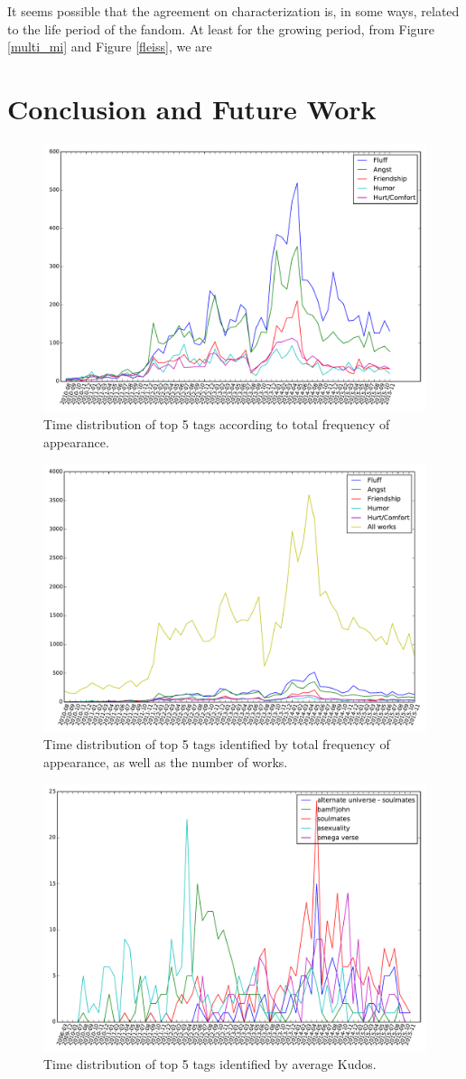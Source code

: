 \documentclass{pnastwo}
\begin{document}
\begin{article}
It seems possible that the agreement on characterization is, in some ways, related to the life period of the fandom. At least for the growing period, from Figure \ref{multi_mi} and Figure \ref{fleiss}, we are 


\section{Conclusion and Future Work}


\end{article}


\begin{figure}
\centerline{\includegraphics[width=.6\textwidth]{top_frequency_tag_time.pdf}}
\caption{Time distribution of top 5 tags according to total frequency of appearance.}\label{freq_tag}
\end{figure}

\begin{figure}
\centerline{\includegraphics[width=.6\textwidth]{top_frequency_tag_time_w_total.pdf}}
\caption{Time distribution of top 5 tags identified by total frequency of appearance, as well as the number of works.}\label{freq_tag_wtotal}
\end{figure}

\begin{figure}
\centerline{\includegraphics[width=.6\textwidth]{top_popularity_tag_time.pdf}}
\caption{Time distribution of top 5 tags identified by average Kudos.}\label{popular_tag}
\end{figure}
\end{document}
